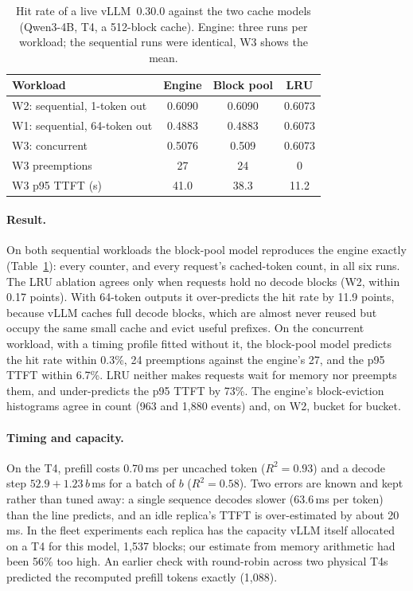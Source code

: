 \documentclass[10pt,twocolumn]{article}
\begin{document}
\begin{table}[t]
\centering\small
\caption{Hit rate of a live vLLM~0.30.0 against the two cache models (Qwen3-4B, T4, a 512-block
cache). Engine: three runs per workload; the sequential runs were identical, W3 shows the mean.}
\label{tab:calib}
\begin{tabular}{@{}lccc@{}}
\toprule
Workload & Engine & Block pool & LRU \\
\midrule
W2: sequential, 1-token out  & 0.6090 & 0.6090 & 0.6073 \\
W1: sequential, 64-token out & 0.4883 & 0.4883 & 0.6073 \\
W3: concurrent               & 0.5076 & 0.509  & 0.6073 \\
\quad W3 preemptions         & 27     & 24     & 0 \\
\quad W3 p95 TTFT (s)        & 41.0   & 38.3   & 11.2 \\
\bottomrule
\end{tabular}
\end{table}

\paragraph{Result.} On both sequential workloads the block-pool model reproduces the engine exactly
(Table~\ref{tab:calib}): every counter, and every request's cached-token count, in all six runs. The
LRU ablation agrees only when requests hold no decode blocks (W2, within 0.17 points). With 64-token
outputs it over-predicts the hit rate by 11.9 points, because vLLM caches full decode blocks, which
are almost never reused but occupy the same small cache and evict useful prefixes. On the concurrent
workload, with a timing profile fitted without it, the block-pool model predicts the hit rate within
0.3\%, 24 preemptions against the engine's 27, and the p95 TTFT within 6.7\%. LRU neither makes
requests wait for memory nor preempts them, and under-predicts the p95 TTFT by 73\%. The engine's
block-eviction histograms agree in count (963 and 1{,}880 events) and, on W2, bucket for bucket.

\paragraph{Timing and capacity.} On the T4, prefill costs 0.70\,ms per uncached token ($R^2 = 0.93$)
and a decode step $52.9 + 1.23\,b$\,ms for a batch of $b$ ($R^2 = 0.58$). Two errors are known and
kept rather than tuned away: a single sequence decodes slower (63.6\,ms per token) than the line
predicts, and an idle replica's TTFT is over-estimated by about 20\,ms. In the fleet experiments each
replica has the capacity vLLM itself allocated on a T4 for this model, 1{,}537 blocks; our estimate
from memory arithmetic had been 56\% too high. An earlier check with round-robin across two physical
T4s predicted the recomputed prefill tokens exactly (1{,}088).
\end{document}
